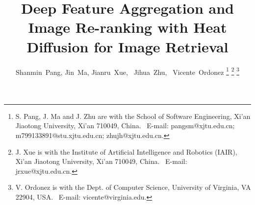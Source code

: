 \documentclass[journal]{IEEEtran}
\begin{document}
%
\title{Deep Feature Aggregation and Image Re-ranking with Heat Diffusion for Image Retrieval}
%
%
%

\author{Shanmin~Pang,
        Jin~Ma,
        Jianru~Xue,~
        Jihua~Zhu,~
        Vicente~Ordonez%
\thanks{S. Pang, J. Ma and J. Zhu are with the School of Software Engineering,
Xi'an Jiaotong University, Xi'an 710049, China.\protect
~E-mail: pangsm@xjtu.edu.cn; m799133891@stu.xjtu.edu.cn;  zhujh@xjtu.edu.cn.}%
\thanks{J. Xue is with the Institute of Artificial Intelligence and Robotics (IAIR), Xi'an Jiaotong University, Xi'an 710049, China.\protect
~E-mail: jrxue@xjtu.edu.cn.}
\thanks{V. Ordonez is with the  Dept. of Computer Science, University of Virginia, VA 22904, USA.\protect
~E-mail: vicente@virginia.edu.}}

%
%
\end{document}
